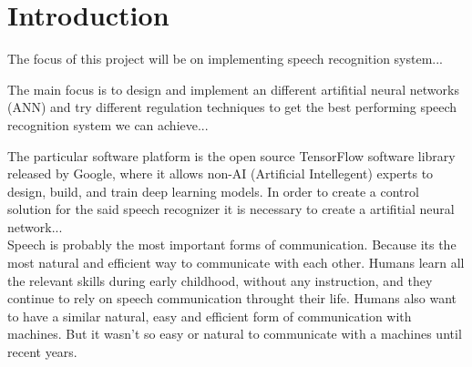 \chapter{Introduction}\label{ch:introduction}

The focus of this project will be on implementing speech recognition system...

The main focus is to design and implement an different artifitial neural networks (ANN) and try different regulation techniques to get the best performing speech recognition system we can achieve...

The particular software platform is the open source TensorFlow \cite{tensorflow2015-whitepaper} software library released by Google, where it allows non-AI (Artificial Intellegent) experts to design, build, and train deep learning models. In order to create a control solution for the said speech recognizer it is necessary to create a artifitial neural network...\\

Speech is probably the most important forms of communication. Because its the most natural and efficient way to communicate with each other. Humans learn all the relevant skills during early childhood, without any instruction, and they continue to rely on speech communication throught their life. Humans also want to have a similar natural, easy and efficient form of communication with machines. But it wasn't so easy or natural to communicate with a machines until recent years.


\cite{kamblespeech}







